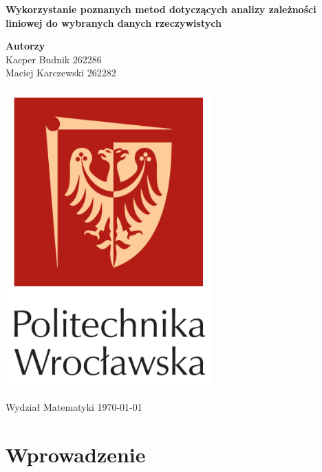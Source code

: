 \documentclass[12pt,leqno]{article}
\theoremstyle{exer}
\begin{document}
	\begin{titlepage}
		\begin{center}
			
			\textbf{\Huge  Wykorzystanie poznanych metod dotyczących analizy zależności liniowej
				do wybranych danych rzeczywistych}
			
			\vspace{0.5cm}
			
			\vspace{1.5cm}
			
			\textbf{\LARGE Autorzy}\\
			\vspace{0.5cm}
			\large Kacper Budnik 262286\\
			\large Maciej Karczewski 262282\\
			
			
			\vfill
			
			\vspace{0.4cm}
			
			\includegraphics[width=0.60\textwidth]{images/logo.PNG}
			
			\vspace{0.8cm}
			Wydział Matematyki	
			\today
		\end{center}
	\end{titlepage}
	\tableofcontents
	\newpage
	
	\section{Wprowadzenie}
	
\end{document}
